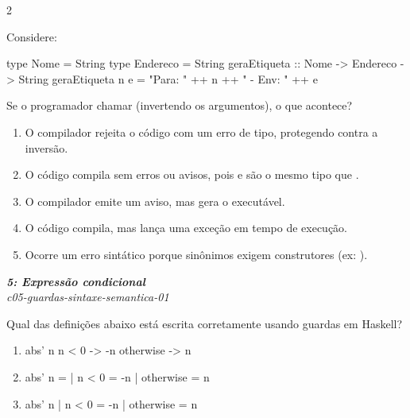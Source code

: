 \documentclass[a4paper,10pt,brazil]{article}
\begin{document}
\begin{multicols}{2}
\begin{flushright}
\end{flushright}
Considere:
\begin{haskellcode}
type Nome = String
type Endereco = String
geraEtiqueta :: Nome -> Endereco -> String
geraEtiqueta n e = "Para: " ++ n ++ " - Env: " ++ e
\end{haskellcode}
Se o programador chamar  (invertendo os argumentos), o que acontece?

\begin{enumerate}
  \item O compilador rejeita o código com um erro de tipo, protegendo contra a inversão.

  \item O código compila sem erros ou avisos, pois  e  são o mesmo tipo que .

  \item O compilador emite um aviso, mas gera o executável.

  \item O código compila, mas lança uma exceção em tempo de execução.

  \item Ocorre um erro sintático porque sinônimos exigem construtores (ex: ).


\end{enumerate}

\begin{flushright}
  \footnotesize
  \textit{\textbf{5: Expressão condicional}}\\
  \textit{c05-guardas-sintaxe-semantica-01}\\

\end{flushright}
Qual das definições abaixo está escrita corretamente usando guardas em Haskell?

\begin{enumerate}
  \item \begin{haskellcode}
abs' n
  n < 0 -> -n
  otherwise -> n
\end{haskellcode}

  \item \begin{haskellcode}
abs' n =
  | n < 0     = -n
  | otherwise = n
\end{haskellcode}

  \item \begin{haskellcode}
abs' n
  | n < 0     = -n
  | otherwise = n
\end{haskellcode}


\end{enumerate}
\end{multicols}
\end{document}
